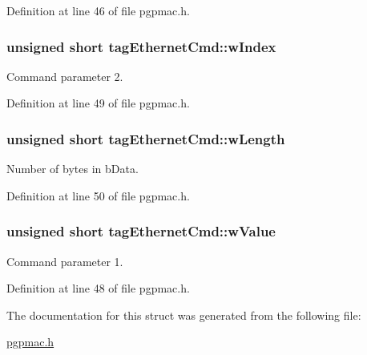 Definition at line 46 of file pgpmac.h.\hypertarget{structtagEthernetCmd_a92f5a374e87d4f496b64b4888850d6e6}{
\subsubsection[{wIndex}]{\setlength{\rightskip}{0pt plus 5cm}unsigned short {\bf tagEthernetCmd::wIndex}}}
\label{structtagEthernetCmd_a92f5a374e87d4f496b64b4888850d6e6}


Command parameter 2. 

Definition at line 49 of file pgpmac.h.\hypertarget{structtagEthernetCmd_af5df25ff13ca30fa33719d0df1ab7e97}{
\subsubsection[{wLength}]{\setlength{\rightskip}{0pt plus 5cm}unsigned short {\bf tagEthernetCmd::wLength}}}
\label{structtagEthernetCmd_af5df25ff13ca30fa33719d0df1ab7e97}


Number of bytes in bData. 

Definition at line 50 of file pgpmac.h.\hypertarget{structtagEthernetCmd_aec0ee9a5f6c7e3bc6e4bd98f1bd52783}{
\subsubsection[{wValue}]{\setlength{\rightskip}{0pt plus 5cm}unsigned short {\bf tagEthernetCmd::wValue}}}
\label{structtagEthernetCmd_aec0ee9a5f6c7e3bc6e4bd98f1bd52783}


Command parameter 1. 

Definition at line 48 of file pgpmac.h.

The documentation for this struct was generated from the following file:\begin{DoxyCompactItemize}
\item 
\hyperlink{pgpmac_8h}{pgpmac.h}\end{DoxyCompactItemize}
